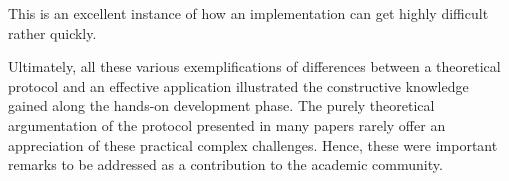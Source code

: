 This is an excellent instance of how an implementation can get highly difficult rather quickly. \newline \newline




Ultimately, all these various exemplifications of differences between a theoretical protocol and an effective application illustrated the constructive knowledge gained along the hands-on development phase. The purely theoretical argumentation of the protocol presented in many papers rarely offer an appreciation of these practical complex challenges. Hence, these were important remarks to be addressed as a contribution to the academic community.

